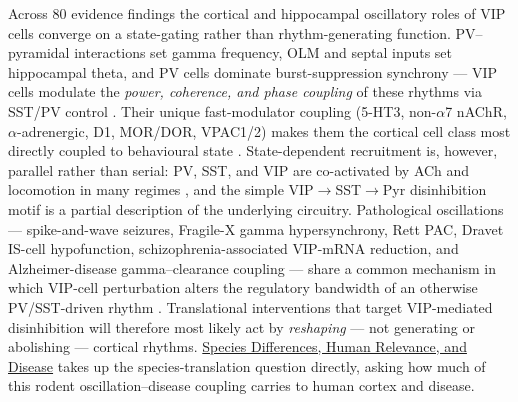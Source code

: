\documentclass[11pt]{article}
\let\origrightarrow\rightarrow
\def\rightarrow{\ensuremath{\origrightarrow}}
\begin{document}
Across 80 evidence findings the cortical and hippocampal oscillatory roles of VIP cells converge on a state-gating rather than rhythm-generating function. PV--pyramidal interactions set gamma frequency, OLM and septal inputs set hippocampal theta, and PV cells dominate burst-suppression synchrony --- VIP cells modulate the \textit{power, coherence, and phase coupling} of these rhythms via SST/PV control \citep{Veit2023, Wagatsuma2023, Tyan2014, Bell2021, Yin2025}. Their unique fast-modulator coupling (5-HT3, non-$\alpha$7 nAChR, $\alpha$-adrenergic, D1, MOR/DOR, VPAC1/2) makes them the cortical cell class most directly coupled to behavioural state \citep{Lee2010, Ferezou2002, Porter1999, Kawaguchi1997b, Kawaguchi1998, Anastasiades2019, Cole2025, Harmar2012}. State-dependent recruitment is, however, parallel rather than serial: PV, SST, and VIP are co-activated by ACh and locomotion in many regimes \citep{Kuchibhotla2017, Pakan2016, Dipoppa2018, Yaeger2019, Ren2022}, and the simple VIP\rightarrow SST\rightarrow Pyr disinhibition motif is a partial description of the underlying circuitry. Pathological oscillations --- spike-and-wave seizures, Fragile-X gamma hypersynchrony, Rett PAC, Dravet IS-cell hypofunction, schizophrenia-associated VIP-mRNA reduction, and Alzheimer-disease gamma--clearance coupling --- share a common mechanism in which VIP-cell perturbation alters the regulatory bandwidth of an otherwise PV/SST-driven rhythm \citep{Hall2015, Goel2025, Kranz2025, Goff2019, Kiss2026, Murdock2024, Koukouli2017}. Translational interventions that target VIP-mediated disinhibition will therefore most likely act by \textit{reshaping} --- not generating or abolishing --- cortical rhythms. \href{/disease-translational}{Species Differences, Human Relevance, and Disease} takes up the species-translation question directly, asking how much of this rodent oscillation--disease coupling carries to human cortex and disease.
\end{document}
